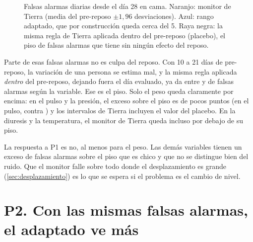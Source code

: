 \begin{figure}[htbp]

\caption[Falsas alarmas diarias del monitor de Tierra y del adaptado]{Falsas alarmas diarias desde el día 28 en cama.
Naranjo: monitor de Tierra (media del pre-reposo $\pm1{,}96$ desviaciones). Azul: rango adaptado, que por construcción
queda cerca del 5\pct. Raya negra: la misma regla de Tierra aplicada dentro del pre-reposo (placebo), el piso de
falsas alarmas que tiene sin ningún efecto del reposo.}
\label{fig:falsas}
\end{figure}

Parte de esas falsas alarmas no es culpa del reposo. Con 10 a 21 días de pre-reposo, la variación de una persona se
estima mal, y la misma regla aplicada \emph{dentro} del pre-reposo, dejando fuera el día evaluado, ya da entre
 y \pct{} de falsas alarmas según la variable. Ese es el piso. Solo el peso
queda claramente por encima: en el pulso y la presión, el exceso sobre el piso es de pocos puntos (en el pulso,
 contra \pct) y los intervalos de Tierra incluyen el valor del placebo. En la diuresis y la temperatura, el monitor de Tierra queda incluso
por debajo de su piso.

\begin{table}[htbp]
\caption[Rango esperado: falsas alarmas, ancho y detección por variable]{Rango esperado por variable, desde el día 28
en cama. Falsas alarmas diarias del monitor de Tierra y de su placebo dentro del pre-reposo. Ancho del rango adaptado
dividido por el del monitor de Tierra calibrado, con el mismo 5\pct{} de falsas alarmas. Escalones de 3 días
detectados con la regla de 2 de 3 y diferencia adaptado menos Tierra calibrado, en puntos.}
\label{tab:rango}
\centering\footnotesize\setlength{\tabcolsep}{4.5pt}

\end{table}

\begin{decision}
La respuesta a P1 es no, al menos para el peso. Las demás variables tienen un exceso de falsas alarmas sobre el piso
que es chico y que no se distingue bien del ruido. Que el monitor falle sobre todo donde el desplazamiento es grande
(\cref{sec:desplazamiento}) es lo que se espera si el problema es el cambio de nivel.
\end{decision}

\section{P2. Con las mismas falsas alarmas, el adaptado ve más}\label{sec:res-p2}

